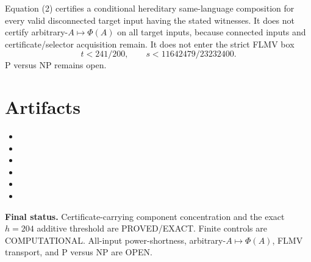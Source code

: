 \documentclass[11pt]{article}
\newcommand{\status}[1]{\textsf{#1}}
\begin{document}
Equation (2) certifies a conditional hereditary same-language composition for every valid disconnected target input having the stated witnesses.  It does not certify arbitrary-$A\mapsto\Phi(A)$ on all target inputs, because connected inputs and certificate/selector acquisition remain.  It does not enter the strict FLMV box
\[
t<241/200,\qquad s<11642479/23232400.
\]
P versus NP remains open.

\section{Artifacts}
\begin{itemize}
\item {}
\item {}
\item {}
\item {}
\item {}
\item {}
\end{itemize}

\noindent\textbf{Final status.}  Certificate-carrying component concentration and the exact $h=204$ additive threshold are \status{PROVED/EXACT}.  Finite controls are \status{COMPUTATIONAL}.  All-input power-shortness, arbitrary-$A\mapsto\Phi(A)$, FLMV transport, and P versus NP are \status{OPEN}.
\end{document}

